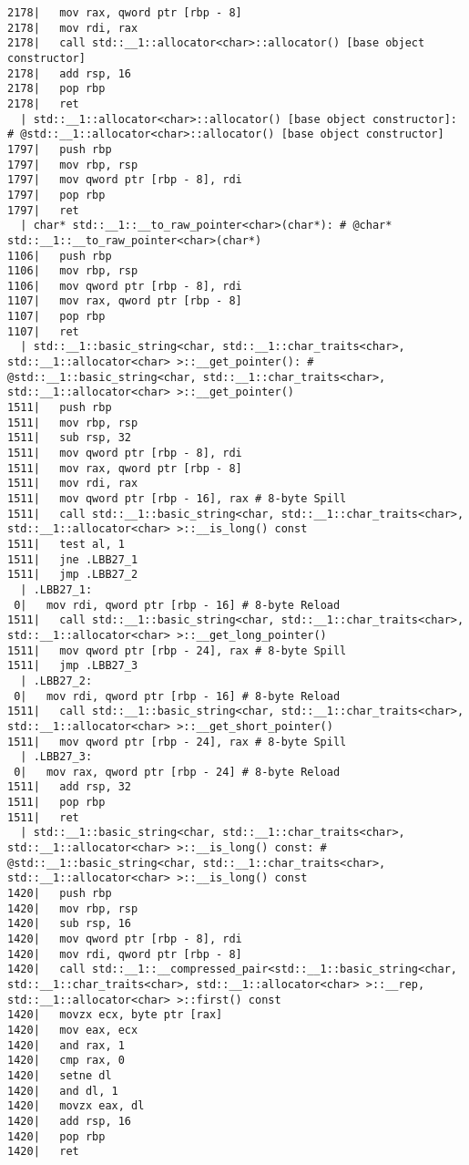 \begin{lstlisting}[language={},numbers=none,title=\href{https://godbolt.org/z/hwKje8}{\texttt{godbolt.org/z/hwKje8}}]
2178|   mov rax, qword ptr [rbp - 8]
2178|   mov rdi, rax
2178|   call std::__1::allocator<char>::allocator() [base object constructor]
2178|   add rsp, 16
2178|   pop rbp
2178|   ret
  | std::__1::allocator<char>::allocator() [base object constructor]: # @std::__1::allocator<char>::allocator() [base object constructor]
1797|   push rbp
1797|   mov rbp, rsp
1797|   mov qword ptr [rbp - 8], rdi
1797|   pop rbp
1797|   ret
  | char* std::__1::__to_raw_pointer<char>(char*): # @char* std::__1::__to_raw_pointer<char>(char*)
1106|   push rbp
1106|   mov rbp, rsp
1106|   mov qword ptr [rbp - 8], rdi
1107|   mov rax, qword ptr [rbp - 8]
1107|   pop rbp
1107|   ret
  | std::__1::basic_string<char, std::__1::char_traits<char>, std::__1::allocator<char> >::__get_pointer(): # @std::__1::basic_string<char, std::__1::char_traits<char>, std::__1::allocator<char> >::__get_pointer()
1511|   push rbp
1511|   mov rbp, rsp
1511|   sub rsp, 32
1511|   mov qword ptr [rbp - 8], rdi
1511|   mov rax, qword ptr [rbp - 8]
1511|   mov rdi, rax
1511|   mov qword ptr [rbp - 16], rax # 8-byte Spill
1511|   call std::__1::basic_string<char, std::__1::char_traits<char>, std::__1::allocator<char> >::__is_long() const
1511|   test al, 1
1511|   jne .LBB27_1
1511|   jmp .LBB27_2
  | .LBB27_1:
 0|   mov rdi, qword ptr [rbp - 16] # 8-byte Reload
1511|   call std::__1::basic_string<char, std::__1::char_traits<char>, std::__1::allocator<char> >::__get_long_pointer()
1511|   mov qword ptr [rbp - 24], rax # 8-byte Spill
1511|   jmp .LBB27_3
  | .LBB27_2:
 0|   mov rdi, qword ptr [rbp - 16] # 8-byte Reload
1511|   call std::__1::basic_string<char, std::__1::char_traits<char>, std::__1::allocator<char> >::__get_short_pointer()
1511|   mov qword ptr [rbp - 24], rax # 8-byte Spill
  | .LBB27_3:
 0|   mov rax, qword ptr [rbp - 24] # 8-byte Reload
1511|   add rsp, 32
1511|   pop rbp
1511|   ret
  | std::__1::basic_string<char, std::__1::char_traits<char>, std::__1::allocator<char> >::__is_long() const: # @std::__1::basic_string<char, std::__1::char_traits<char>, std::__1::allocator<char> >::__is_long() const
1420|   push rbp
1420|   mov rbp, rsp
1420|   sub rsp, 16
1420|   mov qword ptr [rbp - 8], rdi
1420|   mov rdi, qword ptr [rbp - 8]
1420|   call std::__1::__compressed_pair<std::__1::basic_string<char, std::__1::char_traits<char>, std::__1::allocator<char> >::__rep, std::__1::allocator<char> >::first() const
1420|   movzx ecx, byte ptr [rax]
1420|   mov eax, ecx
1420|   and rax, 1
1420|   cmp rax, 0
1420|   setne dl
1420|   and dl, 1
1420|   movzx eax, dl
1420|   add rsp, 16
1420|   pop rbp
1420|   ret

\end{lstlisting}
